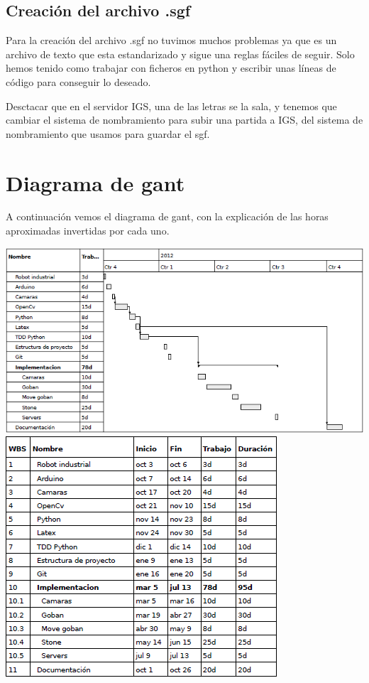 \documentclass[12pt,a4papert,woside,openright,titlepage,final]{book}
\begin{document}


\section{Creación del archivo .sgf}

Para la creación del archivo .sgf no tuvimos muchos problemas ya que es un
archivo de texto que esta estandarizado y sigue una reglas fáciles de seguir.
Solo hemos tenido como trabajar con ficheros en python y escribir unas líneas de
código para conseguir lo deseado.

Desctacar que en el servidor IGS, una de las letras se la sala, y tenemos que
cambiar el sistema de nombramiento para subir una partida a IGS, del sistema de
nombramiento que usamos para guardar el sgf. 



\chapter{Diagrama de gant}

A continuación vemos el diagrama de gant, con la explicación de las horas aproximadas invertidas por cada uno.

\includegraphics[scale=0.9]{gant.png}\\

\includegraphics[scale=1.4]{gant2.png}
\end{document}
